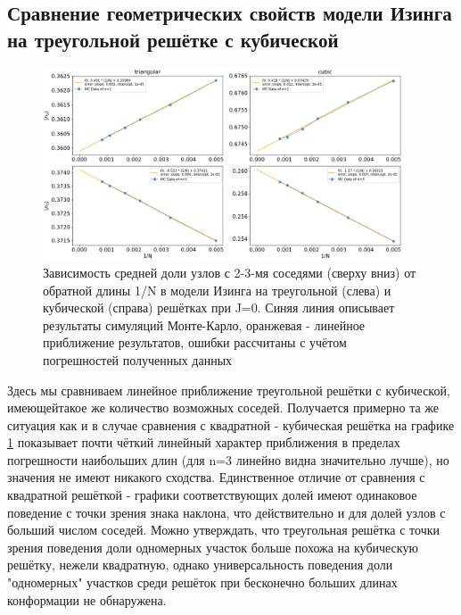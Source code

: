 \subsection{Сравнение геометрических свойств модели Изинга на треугольной решётке с кубической}

\begin{figure}
    \centering
    \includegraphics[width=0.95\textwidth]{Sections/Images/triangle_vs_cubic_bulk.png}
    \caption{Зависимость средней доли узлов с 2-3-мя соседями (сверху вниз) от обратной длины 1/N в модели Изинга на треугольной (слева) и кубической (справа) решётках при J=0. Синяя линия описывает результаты симуляций Монте-Карло, оранжевая - линейное приближение результатов, ошибки рассчитаны с учётом погрешностей полученных данных}
    \label{fig:tr_vs_cb_bulk}
\end{figure}

Здесь мы сравниваем линейное приближение треугольной решётки с кубической, имеющейтакое же количество возможных соседей. Получается примерно та же ситуация как и в случае сравнения с квадратной - кубическая решётка на графике \ref{fig:tr_vs_cb_bulk} показывает почти чёткий линейный характер приближения в пределах погрешности наибольших длин (для n=3 линейно видна значительно лучше), но значения не имеют никакого сходства. Единственное отличие от сравнения с квадратной решёткой - графики соответствующих долей имеют одинаковое поведение с точки зрения знака наклона, что действительно и для долей узлов с больший числом соседей. Можно утверждать, что треугольная решётка с точки зрения поведения доли одномерных участок больше похожа на кубическую решётку, нежели квадратную, однако универсальность поведения доли "одномерных" участков среди решёток при бесконечно больших длинах конформации не обнаружена.